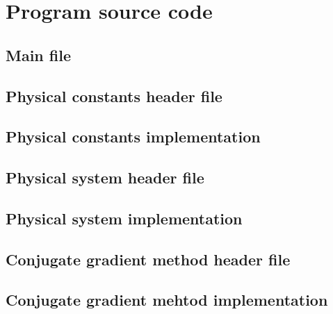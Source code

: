 \appendix
\chapter{Program source code}
\label{ap:source_code}
\small
\section{Main file}



\section{Physical constants header file}



\section{Physical constants implementation}



\section{Physical system header file}



\section{Physical system implementation}



\section{Conjugate gradient method header file}



\section{Conjugate gradient mehtod implementation}



